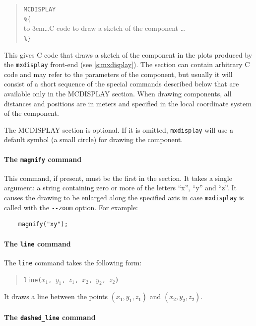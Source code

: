 \begin{quote}
  \texttt{MCDISPLAY} \\
  \verb|%{| \\
  \hbox to 3em{}\ldots C code to draw a sketch of the component \ldots \\
  \verb|%}|
\end{quote}
This gives C code that draws a sketch of the component in the plots
produced by the \verb+mxdisplay+ front-end (see
\cref{s:mxdisplay}). The section can contain arbitrary C code and
may refer to the parameters of the component, but usually it will
consist of a short sequence of the special commands described below that
are available only in the MCDISPLAY section.
When drawing components, all distances and positions are in meters and
specified in the local coordinate system of the component.

The MCDISPLAY section is optional. If it is omitted, \verb+mxdisplay+
will use a default symbol (a small circle) for drawing the component.

\paragraph{The \texttt{magnify} command}

This command, if present, must be the first in the section. It takes a
single argument: a string containing zero or more of the letters ``x'',
``y'' and ``z''. It causes the drawing to be enlarged along the
specified axis in case \verb+mxdisplay+ is called with the \verb+--zoom+
option. For example:
\begin{verbatim}
    magnify("xy");
\end{verbatim}


\paragraph{The \texttt{line} command}

The \texttt{line} command takes the following form:
\begin{quote}
  \texttt{line($x_1$, $y_1$, $z_1$, $x_2$, $y_2$, $z_2$)}
\end{quote}
It draws a line between the points $(x_1, y_1, z_1)$ and $(x_2, y_2,
z_2)$.

\paragraph{The \texttt{dashed\_line} command}

